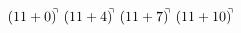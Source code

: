 \documentclass[preview]{standalone}
\begin{document}
\begin{align*}
(11+0)^{\hspace{-0.1cm}\urcorner} \ (11+4)^{\hspace{-0.1cm}\urcorner} \ (11+7)^{\hspace{-0.1cm}\urcorner} \ (11+10)^{\hspace{-0.1cm}\urcorner}
\end{align*}
\end{document}
